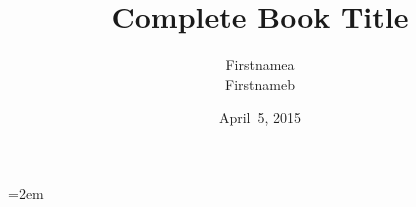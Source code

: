 \documentclass[treatise,english,allpages]{ouvrage-hermes}[2005/11/14]
\title[%
Shortened Book Title]{%
Complete Book Title}
\author{%
Firstnamea \Name{Lastnamea}\\
Firstnameb \Name{Lastnameb}}
\date{%
April~5, 2015}
\begin{document}
\emergencystretch=2em

\frontmatter

\maketitle
%
\tableofcontents
%
%

\mainmatter


%

%

\backmatter

\iftreatise
 
\else
 \nocite{*}
 
\fi
\printindex
\end{document}
